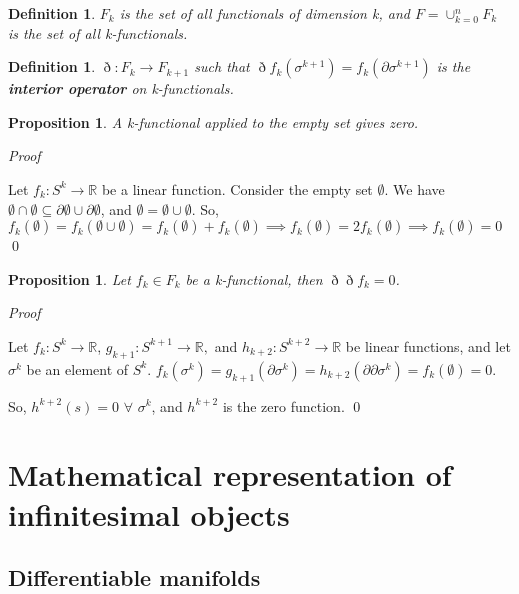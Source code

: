 \documentclass{book}
\newtheorem{defn}[equation]{Definition}
\newtheorem{prop}[equation]{Proposition}
\renewenvironment{proof}{\emph{Proof}}{\qed}
\begin{document}
\begin{defn}
	$F_k$ is the set of all functionals of dimension k, and $F = \cup_{k=0}^nF_k$ is the set of all k-functionals. 
\end{defn}


\begin{defn}
	$\eth : F_k \to F_{k+1}$ such that $\eth f_k(\sigma^{k+1}) = f_k(\partial \sigma^{k+1})$ is the \textbf{interior operator} on k-functionals. 
\end{defn}

\begin{prop}
	A k-functional applied to the empty set gives zero. 
\end{prop}
\begin{proof}
	
	Let $f_k : S^k \to \mathbb{R}$ be a linear function. Consider the empty set $\emptyset$. 
We have $\emptyset \cap \emptyset \subseteq \partial\emptyset \cup \partial\emptyset$, and $\emptyset = \emptyset\cup\emptyset$. 
So, $f_k(\emptyset) = f_k(\emptyset\cup\emptyset) = f_k(\emptyset) + f_k(\emptyset) \implies f_k(\emptyset) = 2f_k(\emptyset) \implies f_k(\emptyset) = 0$
\end{proof}



\begin{prop}
	Let $f_k \in F_k$ be a k-functional, then $\eth\eth f_k = 0 $.
	
	
\end{prop}
\begin{proof}


	Let $f_k : S^k \to \mathbb{R}$, $g_{k+1} : S^{k+1} \to \mathbb{R},$ and $h_{k+2}: S^{k+2} \to \mathbb{R}$ be linear functions, and let $\sigma^k$ be an element of $S^k$. $f_k(\sigma^k) = g_{k+1}(\partial \sigma^k) = h_{k+2}(\partial\partial \sigma^k) = f_k(\emptyset) = 0$. 
	
	So, $h^{k+2}(s) = 0$ $\forall$ $\sigma^k$, and $h^{k+2}$ is the zero function. 
\end{proof}







\chapter{Mathematical representation of infinitesimal objects}


\section{Differentiable manifolds}
\end{document}
